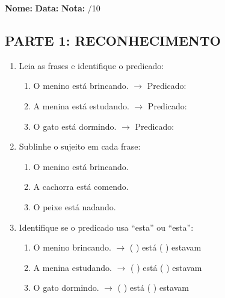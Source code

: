 \begin{exercicio}
\noindent\textbf{Nome:} \underline{\hspace{3.2cm}} \quad \textbf{Data:} \underline{\hspace{1.6cm}} \quad \textbf{Nota:} \underline{\hspace{0.9cm}}/10

\subsection*{PARTE 1: RECONHECIMENTO}

\begin{enumerate}
  \item Leia as frases e identifique o predicado:
  \begin{enumerate}[label=\alph*)]
    \item O menino est\'a brincando. $\rightarrow$ Predicado: \underline{\hspace{4cm}}
    \item A menina est\'a estudando. $\rightarrow$ Predicado: \underline{\hspace{4cm}}
    \item O gato est\'a dormindo. $\rightarrow$ Predicado: \underline{\hspace{4cm}}
  \end{enumerate}

  \item Sublinhe o sujeito em cada frase:
  \begin{enumerate}[label=\alph*)]
    \item O menino est\'a brincando.
    \item A cachorra est\'a comendo.
    \item O peixe est\'a nadando.
  \end{enumerate}

  \item Identifique se o predicado usa ``esta'' ou ``esta'':
  \begin{enumerate}[label=\alph*)]
    \item O menino \underline{\hspace{1cm}} brincando. $\rightarrow$ ( ) est\'a ( ) estavam
    \item A menina \underline{\hspace{1cm}} estudando. $\rightarrow$ ( ) est\'a ( ) estavam
    \item O gato \underline{\hspace{1cm}} dormindo. $\rightarrow$ ( ) est\'a ( ) estavam
  \end{enumerate}


\end{enumerate}
\end{exercicio}
